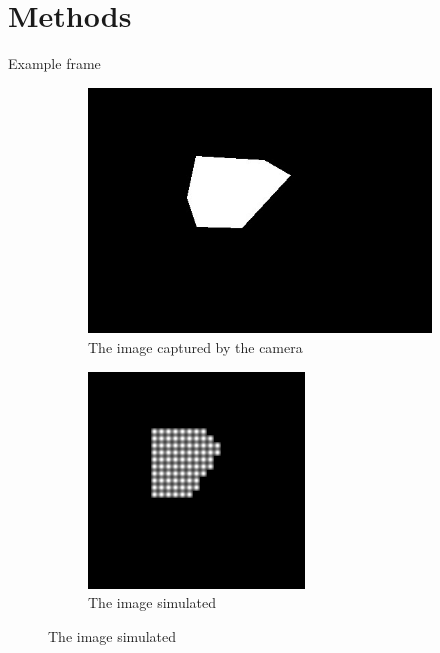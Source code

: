 \documentclass[]{beamer}
\theoremstyle{remark}
\begin{document}
\section{Methods}

\begin{frame}{Example frame}
\begin{figure}[h] %
	\centering
	
	\begin{subfigure}{0.45\textwidth}
		\centering
		\includegraphics[width=\textwidth]{first_orig_frame.png}
		\caption{The image captured by the camera}
		\label{compare_images:orig}
	\end{subfigure}
	\hfill
	\begin{subfigure}{0.45\textwidth}
		\centering
		\includegraphics[width=\textwidth]{first_simulated_frame.png}
		\caption{The image simulated}
		\label{compare_images:analysed}
	\end{subfigure}
	

\end{figure}
\end{frame}
\end{document}
